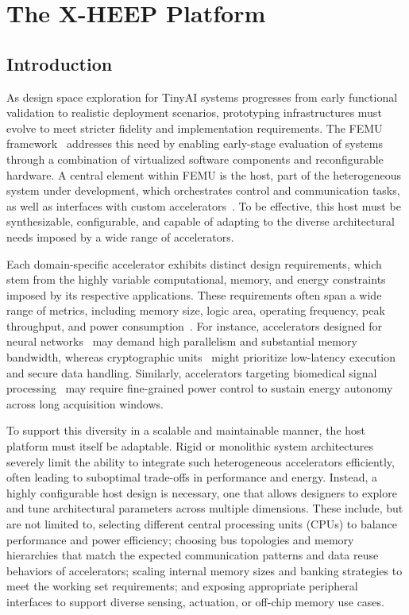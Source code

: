\chapter{The X-HEEP Platform}

    \section{Introduction}
    \label{sec:introduction}

        As design space exploration for TinyAI systems progresses from early functional validation to realistic deployment scenarios, prototyping infrastructures must evolve to meet stricter fidelity and implementation requirements. The FEMU framework~\cite{femu} addresses this need by enabling early-stage evaluation of systems through a combination of virtualized software components and reconfigurable hardware. A central element within FEMU is the host, part of the heterogeneous system under development, which orchestrates control and communication tasks, as well as interfaces with custom accelerators~\cite{e-gpu, asip, oe-cgra, blade}. To be effective, this host must be synthesizable, configurable, and capable of adapting to the diverse architectural needs imposed by a wide range of accelerators.

        Each domain-specific accelerator exhibits distinct design requirements, which stem from the highly variable computational, memory, and energy constraints imposed by its respective applications. These requirements often span a wide range of metrics, including memory size, logic area, operating frequency, peak throughput, and power consumption~\cite{x-heep}. For instance, accelerators designed for neural networks~\cite{cnn-accel} may demand high parallelism and substantial memory bandwidth, whereas cryptographic units~\cite{keccak} might prioritize low-latency execution and secure data handling. Similarly, accelerators targeting biomedical signal processing~\cite{oe-cgra, blade} may require fine-grained power control to sustain energy autonomy across long acquisition windows.

        To support this diversity in a scalable and maintainable manner, the host platform must itself be adaptable. Rigid or monolithic system architectures severely limit the ability to integrate such heterogeneous accelerators efficiently, often leading to suboptimal trade-offs in performance and energy. Instead, a highly configurable host design is necessary, one that allows designers to explore and tune architectural parameters across multiple dimensions. These include, but are not limited to, selecting different central processing units (CPUs) to balance performance and power efficiency; choosing bus topologies and memory hierarchies that match the expected communication patterns and data reuse behaviors of accelerators; scaling internal memory sizes and banking strategies to meet the working set requirements; and exposing appropriate peripheral interfaces to support diverse sensing, actuation, or off-chip memory use cases.

